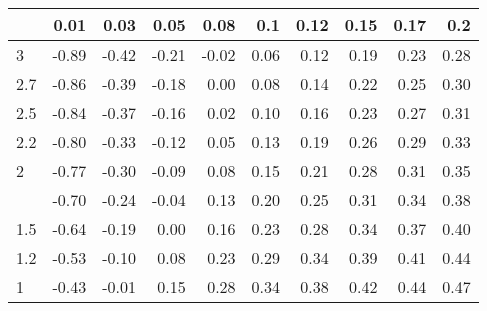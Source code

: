 
\begin{tabular}{lrrrrrrrrr}
\toprule
  & 0.01 & 0.03 & 0.05 & 0.08 & 0.1 & 0.12 & 0.15 & 0.17 & 0.2\\
\midrule
3 & -0.89 & -0.42 & -0.21 & -0.02 & 0.06 & 0.12 & 0.19 & 0.23 & 0.28\\
2.7 & -0.86 & -0.39 & -0.18 & 0.00 & 0.08 & 0.14 & 0.22 & 0.25 & 0.30\\
2.5 & -0.84 & -0.37 & -0.16 & 0.02 & 0.10 & 0.16 & 0.23 & 0.27 & 0.31\\
2.2 & -0.80 & -0.33 & -0.12 & 0.05 & 0.13 & 0.19 & 0.26 & 0.29 & 0.33\\
2 & -0.77 & -0.30 & -0.09 & 0.08 & 0.15 & 0.21 & 0.28 & 0.31 & 0.35\\
\addlinespace
1.7 & -0.70 & -0.24 & -0.04 & 0.13 & 0.20 & 0.25 & 0.31 & 0.34 & 0.38\\
1.5 & -0.64 & -0.19 & 0.00 & 0.16 & 0.23 & 0.28 & 0.34 & 0.37 & 0.40\\
1.2 & -0.53 & -0.10 & 0.08 & 0.23 & 0.29 & 0.34 & 0.39 & 0.41 & 0.44\\
1 & -0.43 & -0.01 & 0.15 & 0.28 & 0.34 & 0.38 & 0.42 & 0.44 & 0.47\\
\bottomrule
\end{tabular}
